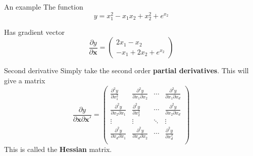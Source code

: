 \documentclass[10pt]{beamer}
\begin{document}
\begin{frame}{An example}
  The function
  \begin{equation}
    y=x_1^2-x_1x_2+x_2^2+e^{x_2}
  \end{equation}

  Has gradient vector
  \begin{equation}
    \frac{\partial y}{\partial{\bm x}}=\left(\begin{array}{c}
                                               2x_1-x_2\\
                                               -x_1+2x_2+e^{x_2}
                                             \end{array}
                                           \right)
                                         \end{equation}
                                       \end{frame}
                                       \begin{frame}{Second derivative}
                                         Simply take the second order {\bf partial derivatives}.  This will give a matrix
                                         \begin{equation}
                                           \frac{\partial y}{\partial{\bm x}\partial{\bm x}'}=
                                           \left(
                                             \begin{array}{cccc}
                                               \frac{\partial^2 y}{\partial x_1^2}&\frac{\partial^2 y}{\partial x_1\partial x_2}&\cdots&\frac{\partial^2 y}{\partial x_1\partial x_d}\\
                                               \frac{\partial^2 y}{\partial x_2\partial x_1}&\frac{\partial^2 y}{\partial x_2^2}&\cdots&\frac{\partial^2 y}{\partial x_2\partial x_d}\\
                                               \vdots&\vdots&\ddots&\vdots\\
                                               \frac{\partial^2 y}{\partial x_d\partial x_1}&\frac{\partial^2 y}{\partial x_d\partial x_2}&\cdots&\frac{\partial^2 y}{\partial x_d^2}\\
                                             \end{array}
                                           \right)
                                         \end{equation}
                                         This is called the {\bf Hessian} matrix.
                                       \end{frame}
\end{document}

